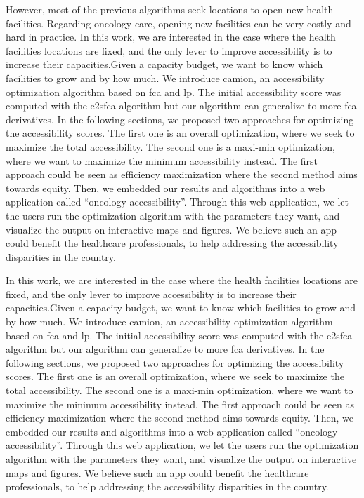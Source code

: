 However, most of the previous algorithms seek locations to open new health
facilities. Regarding oncology care, opening new facilities can be very costly
and hard in practice. In this work, we are interested in the case where the
health facilities locations are fixed, and the only lever to improve
accessibility is to increase their capacities.Given a capacity budget, we want
to know which facilities to grow and by how much. We introduce \ac{camion}, an
accessibility optimization algorithm based on \ac{fca} and \ac{lp}. The initial
accessibility score was computed with the \ac{e2sfca} algorithm
\cite{luo_enhanced_2009} but our algorithm can generalize to more \ac{fca}
derivatives. In the following sections, we proposed two approaches for
optimizing the accessibility scores. The first one is an overall optimization,
where we seek to maximize the total accessibility. The second one is a maxi-min
optimization, where we want to maximize the minimum accessibility instead. The
first approach could be seen as efficiency maximization where the second method
aims towards equity. Then, we embedded our results and algorithms into a
web application  called ``oncology-accessibility''. Through this web
application, we let the users run the optimization algorithm with the
parameters they want, and visualize the output on interactive maps and
figures. We believe such an app could benefit the healthcare professionals,
to help addressing the accessibility disparities in the country.

In this work, we are interested in the case where the health facilities locations are
fixed, and the only lever to improve accessibility is to increase their
capacities.Given a capacity budget, we want to know which facilities to grow and
by how much. We introduce \ac{camion}, an accessibility optimization algorithm
based on \ac{fca} and \ac{lp}. The initial accessibility score was computed with
the \ac{e2sfca} algorithm \cite{luo_enhanced_2009} but our algorithm can
generalize to more \ac{fca} derivatives. In the following sections, we proposed
two approaches for optimizing the accessibility scores. The first one is an
overall optimization, where we seek to maximize the total accessibility. The
second one is a maxi-min optimization, where we want to maximize the minimum
accessibility instead. The first approach could be seen as efficiency
maximization where the second method aims towards equity. Then, we embedded our
results and algorithms into a web application  called
``oncology-accessibility''. Through this web application, we let the users run
the optimization algorithm with the parameters they want, and visualize the
output on interactive maps and figures. We believe such an app could benefit the
healthcare professionals, to help addressing the accessibility disparities in
the country.

